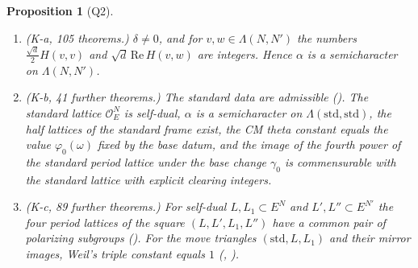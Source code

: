 \documentclass[11pt]{article}
\newcommand{\OEr}{\mathcal O_E}
\newtheorem{proposition}[theorem]{Proposition}
\theoremstyle{remark}
\begin{document}
\begin{proposition}[Q2]\label{prop:Q2}
\begin{enumerate}[label=(\alph*),itemsep=1pt]
\item \emph{(K-a, 105 theorems.)} $\delta\neq0$, and for $v,w\in\Lambda(N,N')$ the numbers $\frac{\sqrt d}2H(v,v)$ and $\sqrt d\,\mathrm{Re}\,H(v,w)$ are integers. Hence $\alpha$ is a semicharacter on $\Lambda(N,N')$.
\item \emph{(K-b, 41 further theorems.)} The standard data are admissible (). The standard lattice $\OEr^N$ is self-dual, $\alpha$ is a semicharacter on $\Lambda(\mathrm{std},\mathrm{std})$, the half lattices of the standard frame exist, the CM theta constant equals the value $\varphi_0(\omega)$ fixed by the base datum, and the image of the fourth power of the standard period lattice under the base change $\gamma_0$ is commensurable with the standard lattice with explicit clearing integers.
\item \emph{(K-c, 89 further theorems.)} For self-dual $L,L_1\subset E^N$ and $L',L''\subset E^{N'}$ the four period lattices of the square $(L,L',L_1,L'')$ have a common pair of polarizing subgroups (). For the move triangles $(\mathrm{std},L,L_1)$ and their mirror images, Weil's triple constant equals $1$ (, ).
\end{enumerate}
\end{proposition}
\end{document}
